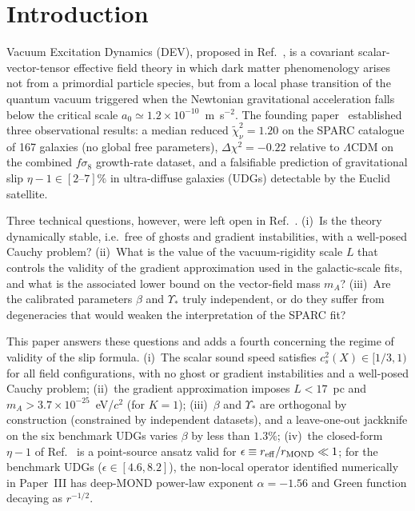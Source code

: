 \documentclass[aps,prd,reprint,floatfix,nofootinbib,superscriptaddress]{revtex4-2}
\newcommand{\aO}{a_0}
\begin{document}
\maketitle

\section{Introduction}

Vacuum Excitation Dynamics (DEV), proposed in Ref.~\cite{Mendes2026},
is a covariant scalar-vector-tensor effective field theory in which
dark matter phenomenology arises not from a primordial particle
species, but from a local phase transition of the quantum vacuum
triggered when the Newtonian gravitational acceleration falls below
the critical scale $\aO\simeq 1.2\times10^{-10}$~m~s$^{-2}$.
The founding paper~\cite{Mendes2026} established three observational
results: a median reduced $\widetilde{\chi}^2_\nu = 1.20$ on the
SPARC catalogue of 167 galaxies (no global free parameters),
$\Delta\chi^2 = -0.22$ relative to $\Lambda$CDM on the combined
$f\sigma_8$ growth-rate dataset, and a falsifiable prediction of
gravitational slip $\eta-1\in[2\text{--}7]\%$ in ultra-diffuse
galaxies (UDGs) detectable by the Euclid satellite.

Three technical questions, however, were left open in
Ref.~\cite{Mendes2026}.
(i)~Is the theory dynamically stable, i.e.\ free of ghosts and
gradient instabilities, with a well-posed Cauchy problem?
(ii)~What is the value of the vacuum-rigidity scale $L$ that
controls the validity of the gradient approximation used in the
galactic-scale fits, and what is the associated lower bound on
the vector-field mass $m_A$?
(iii)~Are the calibrated parameters $\beta$ and $\Upsilon_*$ truly
independent, or do they suffer from degeneracies that would weaken
the interpretation of the SPARC fit?

This paper answers these questions and adds a fourth concerning
the regime of validity of the slip formula.
(i)~The scalar sound speed satisfies
$c_s^2(X) \in [1/3,1)$ for all field configurations, with no
ghost or gradient instabilities and a well-posed Cauchy problem;
(ii)~the gradient approximation imposes $L<17$~pc and
$m_A > 3.7\times 10^{-25}$~eV/$c^2$ (for $K=1$);
(iii)~$\beta$ and $\Upsilon_*$ are orthogonal by construction
(constrained by independent datasets), and a leave-one-out
jackknife on the six benchmark UDGs varies $\beta$ by less
than $1.3\%$;
(iv)~the closed-form $\eta-1$ of Ref.~\cite{Mendes2026} is a
point-source ansatz valid for $\epsilon\equiv r_{\rm
eff}/r_{\rm MOND}\ll 1$; for the benchmark UDGs ($\epsilon\in
[4.6,8.2]$), the non-local operator identified numerically in
Paper~III has deep-MOND power-law exponent $\alpha = -1.56$
and Green function decaying as $r^{-1/2}$.
\end{document}
